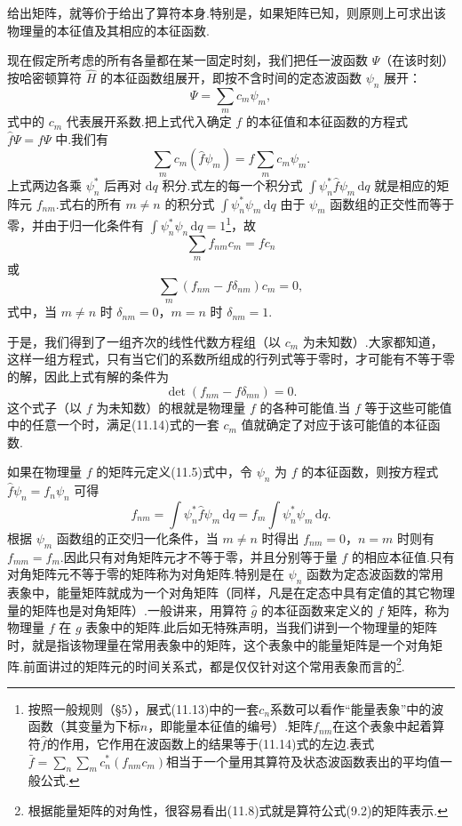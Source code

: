 给出矩阵，就等价于给出了算符本身.特别是，如果矩阵已知，则原则上可求出该物理量的本征值及其相应的本征函数.

现在假定所考虑的所有各量都在某一固定时刻，我们把任一波函数 $\varPsi$（在该时刻）按哈密顿算符 $\hat{H}$ 的本征函数组展开，即按不含时间的定态波函数 $\psi_n$ 展开：
\begin{equation}
  \varPsi=\sum_mc_m\psi_m,
\end{equation}
式中的 $c_m$ 代表展开系数.把上式代入确定 $f$ 的本征值和本征函数的方程式 $\hat{f}\varPsi=f\varPsi$ 中.我们有
\begin{equation*}
  \sum_mc_m(\hat{f}\psi_m)=f\sum_mc_m\psi_m.
\end{equation*}
上式两边各乘 $\psi_n^{*}$ 后再对 $\mathrm{d}q$ 积分.式左的每一个积分式 $\int\psi_n^{*}\hat{f}\psi_m\,\mathrm{d}q$ 就是相应的矩阵元 $f_{nm}$.式右的所有 $m\neq n$ 的积分式 $\int\psi_n^{*}\psi_m\,\mathrm{d}q$ 由于 $\psi_m$ 函数组的正交性而等于零，并由于归一化条件有 $\int\psi_n^{*}\psi_n\,\mathrm{d}q=1$\footnote{按照一般规则（§5），展式(11.13)中的一套$c_n$系数可以看作“能量表象”中的波函数（其变量为下标$n$，即能量本征值的编号）.矩阵$f_{nm}$在这个表象中起着算符$\hat{f}$的作用，它作用在波函数上的结果等于(11.14)式的左边.表式$\bar{f}=\sum_n\sum_m c_n^{*}(f_{nm}c_m)$相当于一个量用其算符及状态波函数表出的平均值一般公式.}，故
\begin{equation}
  \sum_mf_{nm}c_m=fc_n
\end{equation}
或
\begin{equation*}
  \sum_m(f_{nm}-f\delta_{nm})c_m=0,
\end{equation*}
式中，当 $m\neq n$ 时 $\delta_{nm}=0$，$m=n$ 时 $\delta_{nm}=1$.

于是，我们得到了一组齐次的线性代数方程组（以 $c_m$ 为未知数）.大家都知道，这样一组方程式，只有当它们的系数所组成的行列式等于零时，才可能有不等于零的解，因此上式有解的条件为
\begin{equation}
  \det(f_{nm}-f\delta_{mn})=0.
\end{equation}
这个式子（以 $f$ 为未知数）的根就是物理量 $f$ 的各种可能值.当 $f$ 等于这些可能值中的任意一个时，满足(11.14)式的一套 $c_m$ 值就确定了对应于该可能值的本征函数.

如果在物理量 $f$ 的矩阵元定义(11.5)式中，令 $\psi_n$ 为 $f$ 的本征函数，则按方程式 $\hat{f}\psi_n=f_n\psi_n$ 可得
\begin{equation*}
  f_{nm}=\int\psi_n^{*}\hat{f}\psi_m\,\mathrm{d}q
  =f_m\int\psi_n^{*}\psi_m\,\mathrm{d}q.
\end{equation*}
根据 $\psi_m$ 函数组的正交归一化条件，当 $m\neq n$ 时得出 $f_{nm}=0$，$n=m$ 时则有 $f_{mm}=f_m$.因此只有对角矩阵元才不等于零，并且分别等于量 $f$ 的相应本征值.只有对角矩阵元不等于零的矩阵称为对角矩阵.特别是在 $\psi_n$ 函数为定态波函数的常用表象中，能量矩阵就成为一个对角矩阵（同样，凡是在定态中具有定值的其它物理量的矩阵也是对角矩阵）.一般讲来，用算符 $\hat{g}$ 的本征函数来定义的 $f$ 矩阵，称为物理量 $f$ 在 $g$ 表象中的矩阵.此后如无特殊声明，当我们讲到一个物理量的矩阵时，就是指该物理量在常用表象中的矩阵，这个表象中的能量矩阵是一个对角矩阵.前面讲过的矩阵元的时间关系式，都是仅仅针对这个常用表象而言的\footnote{根据能量矩阵的对角性，很容易看出(11.8)式就是算符公式(9.2)的矩阵表示.}.

